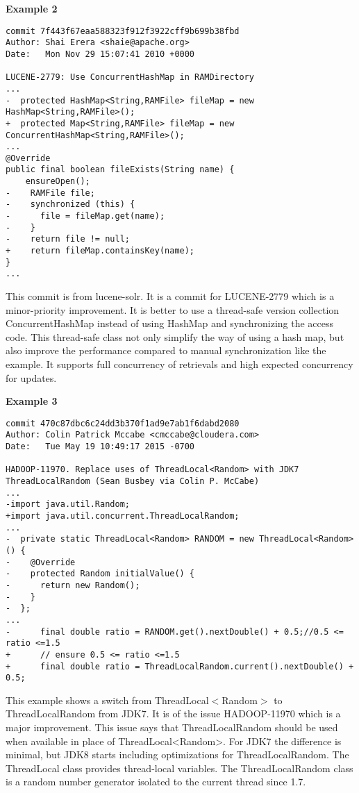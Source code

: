 \documentclass[conference]{IEEEtran}
\begin{document}
\textbf{Example 2}
\begin{lstlisting}
commit 7f443f67eaa588323f912f3922cff9b699b38fbd
Author: Shai Erera <shaie@apache.org>
Date:   Mon Nov 29 15:07:41 2010 +0000

LUCENE-2779: Use ConcurrentHashMap in RAMDirectory
...
-  protected HashMap<String,RAMFile> fileMap = new HashMap<String,RAMFile>();
+  protected Map<String,RAMFile> fileMap = new ConcurrentHashMap<String,RAMFile>();
...
@Override
public final boolean fileExists(String name) {
    ensureOpen();
-    RAMFile file;
-    synchronized (this) {
-      file = fileMap.get(name);
-    }
-    return file != null;
+    return fileMap.containsKey(name);
}
...
\end{lstlisting}

This commit is from lucene-solr. It is a commit for LUCENE-2779 which is a minor-priority improvement. It is better to use a thread-safe version collection ConcurrentHashMap instead of using HashMap and synchronizing the access code. This thread-safe class not only simplify the way of using a hash map, but also improve the performance compared to manual synchronization like the example. It supports full concurrency of retrievals and high expected concurrency for updates.

\textbf{Example 3}
\begin{lstlisting}
commit 470c87dbc6c24dd3b370f1ad9e7ab1f6dabd2080
Author: Colin Patrick Mccabe <cmccabe@cloudera.com>
Date:   Tue May 19 10:49:17 2015 -0700

HADOOP-11970. Replace uses of ThreadLocal<Random> with JDK7 ThreadLocalRandom (Sean Busbey via Colin P. McCabe)
...
-import java.util.Random;
+import java.util.concurrent.ThreadLocalRandom;
...
-  private static ThreadLocal<Random> RANDOM = new ThreadLocal<Random>() {
-    @Override
-    protected Random initialValue() {
-      return new Random();
-    }
-  };
...
-      final double ratio = RANDOM.get().nextDouble() + 0.5;//0.5 <= ratio <=1.5
+      // ensure 0.5 <= ratio <=1.5
+      final double ratio = ThreadLocalRandom.current().nextDouble() + 0.5;
\end{lstlisting}

This example shows a switch from ThreadLocal$<$Random$>$ to ThreadLocalRandom from JDK7. It is of the issue HADOOP-11970 which is a major improvement. This issue says that ThreadLocalRandom should be used when available in place of ThreadLocal<Random>. For JDK7 the difference is minimal, but JDK8 starts including optimizations for ThreadLocalRandom. The ThreadLocal class provides thread-local variables. The ThreadLocalRandom class is a random number generator isolated to the current thread since 1.7.
\end{document}
